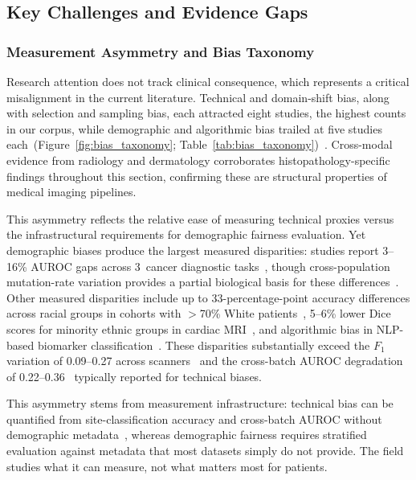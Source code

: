 \subsection{Key Challenges and Evidence Gaps}
\label{sec:discussion:patterns}

\subsubsection{Measurement Asymmetry and Bias Taxonomy}
Research attention does not track clinical consequence, which represents a critical misalignment in the current literature. Technical and domain-shift bias, along with selection and sampling bias, each attracted eight studies, the highest counts in our corpus, while demographic and algorithmic bias trailed at five studies each~(Figure~\ref{fig:bias_taxonomy}; Table~\ref{tab:bias_taxonomy})~\citep{vaidya2024demographic, howard2021site, chen2025predicting, lin2025contrastive, komen2024batch, dehkharghanian2023biased, kheiri2025investigation, ling2024agent, campanella2019clinical, zong2023medfair, cecconi2024fairness, soltan2024challenges, celi2022sources, musa2026cross, tasci2022bias, ktena2024generative, hagele2020resolving, vanbooven2025mitigating}. Cross-modal evidence from radiology and dermatology corroborates histopathology-specific findings throughout this section, confirming these are structural properties of medical imaging pipelines.

This asymmetry reflects the relative ease of measuring technical proxies versus the infrastructural requirements for demographic fairness evaluation. Yet demographic biases produce the largest measured disparities: studies report 3--16\% AUROC gaps across 3~cancer diagnostic tasks~\citep{vaidya2024demographic}, though cross-population mutation-rate variation provides a partial biological basis for these differences~\citep{polin2025mutation}. Other measured disparities include up to 33-percentage-point accuracy differences across racial groups in cohorts with $>$70\% White patients~\citep{soltan2024challenges}, 5--6\% lower Dice scores for minority ethnic groups in cardiac MRI~\citep{puyolantion2022fairness}, and algorithmic bias in NLP-based biomarker classification~\citep{tschida2025evaluating}. These disparities substantially exceed the $F_1$ variation of 0.09--0.27 across scanners~\citep{aubreville2022mitosis} and the cross-batch AUROC degradation of 0.22--0.36~\citep{lin2025stain} typically reported for technical biases.

This asymmetry stems from measurement infrastructure: technical bias can be quantified from site-classification accuracy and cross-batch AUROC without demographic metadata~\citep{dehkharghanian2023biased, kheiri2025investigation}, whereas demographic fairness requires stratified evaluation against metadata that most datasets simply do not provide. The field studies what it can measure, not what matters most for patients.

